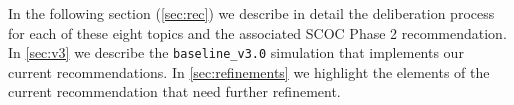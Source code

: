 In the following section (\autoref{sec:rec}) we describe in detail the deliberation process for each of these eight topics and the associated SCOC Phase 2 recommendation. In \autoref{sec:v3} we describe the \texttt{baseline\_v3.0} simulation that implements our current recommendations. In \autoref{sec:refinements} we highlight the elements of the current recommendation that need further refinement.

